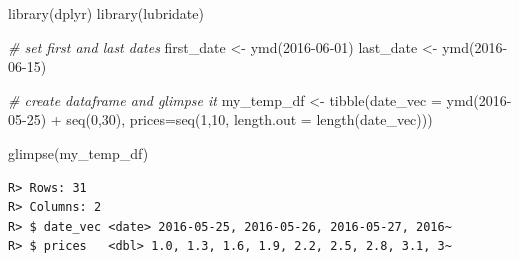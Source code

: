 \documentclass[
  11pt,
]{book}
\newenvironment{Shaded}{\begin{snugshade}}{\end{snugshade}}
\newcommand{\AttributeTok}[1]{\textcolor[rgb]{0.61,0.61,0.61}{#1}}
\newcommand{\CommentTok}[1]{\textcolor[rgb]{0.37,0.37,0.37}{\textit{#1}}}
\newcommand{\DecValTok}[1]{\textcolor[rgb]{0.06,0.06,0.06}{#1}}
\newcommand{\FunctionTok}[1]{\textcolor[rgb]{0,0,0}{#1}}
\newcommand{\NormalTok}[1]{#1}
\newcommand{\OtherTok}[1]{\textcolor[rgb]{0.37,0.37,0.37}{#1}}
\newcommand{\SpecialCharTok}[1]{\textcolor[rgb]{0,0,0}{#1}}
\newcommand{\StringTok}[1]{\textcolor[rgb]{0.5,0.5,0.5}{#1}}
\begin{document}
\begin{Shaded}
\begin{Highlighting}[]
\FunctionTok{library}\NormalTok{(dplyr)}
\FunctionTok{library}\NormalTok{(lubridate)}

\CommentTok{\# set first and last dates}
\NormalTok{first\_date }\OtherTok{\textless{}{-}} \FunctionTok{ymd}\NormalTok{(}\StringTok{\textquotesingle{}2016{-}06{-}01\textquotesingle{}}\NormalTok{)}
\NormalTok{last\_date }\OtherTok{\textless{}{-}} \FunctionTok{ymd}\NormalTok{(}\StringTok{\textquotesingle{}2016{-}06{-}15\textquotesingle{}}\NormalTok{)}

\CommentTok{\# create \textasciigrave{}dataframe\textasciigrave{} and glimpse it}
\NormalTok{my\_temp\_df }\OtherTok{\textless{}{-}} \FunctionTok{tibble}\NormalTok{(}\AttributeTok{date\_vec =} \FunctionTok{ymd}\NormalTok{(}\StringTok{\textquotesingle{}2016{-}05{-}25\textquotesingle{}}\NormalTok{) }\SpecialCharTok{+} \FunctionTok{seq}\NormalTok{(}\DecValTok{0}\NormalTok{,}\DecValTok{30}\NormalTok{),}
                     \AttributeTok{prices=}\FunctionTok{seq}\NormalTok{(}\DecValTok{1}\NormalTok{,}\DecValTok{10}\NormalTok{,}
                                \AttributeTok{length.out =} \FunctionTok{length}\NormalTok{(date\_vec)))}

\FunctionTok{glimpse}\NormalTok{(my\_temp\_df)}
\end{Highlighting}
\end{Shaded}

\begin{verbatim}
R> Rows: 31
R> Columns: 2
R> $ date_vec <date> 2016-05-25, 2016-05-26, 2016-05-27, 2016~
R> $ prices   <dbl> 1.0, 1.3, 1.6, 1.9, 2.2, 2.5, 2.8, 3.1, 3~
\end{verbatim}

\begin{Shaded}
\end{Shaded}
\end{document}
